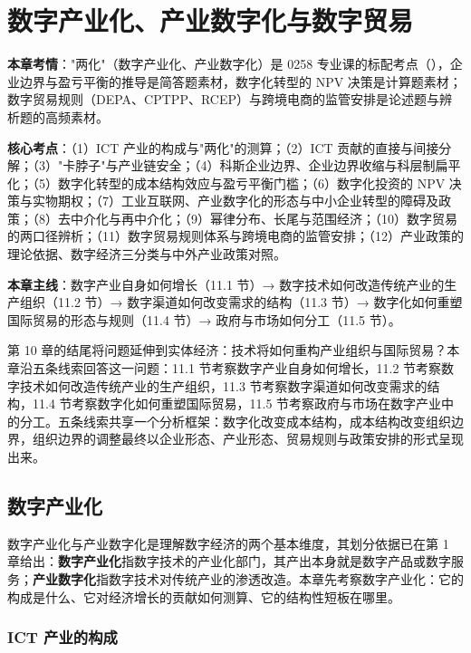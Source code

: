 \chapter{数字产业化、产业数字化与数字贸易}

\begin{examguide}
\textbf{本章考情}："两化"（数字产业化、产业数字化）是 0258 专业课的标配考点（），企业边界与盈亏平衡的推导是简答题素材，数字化转型的 NPV 决策是计算题素材；数字贸易规则（DEPA、CPTPP、RCEP）与跨境电商的监管安排是论述题与辨析题的高频素材。

\textbf{核心考点}：（1）ICT 产业的构成与"两化"的测算；（2）ICT 贡献的直接与间接分解；（3）"卡脖子"与产业链安全；（4）科斯企业边界、企业边界收缩与科层制扁平化；（5）数字化转型的成本结构效应与盈亏平衡门槛；（6）数字化投资的 NPV 决策与实物期权；（7）工业互联网、产业数字化的形态与中小企业转型的障碍及政策；（8）去中介化与再中介化；（9）幂律分布、长尾与范围经济；（10）数字贸易的两口径辨析；（11）数字贸易规则体系与跨境电商的监管安排；（12）产业政策的理论依据、数字经济三分类与中外产业政策对照。

\textbf{本章主线}：数字产业自身如何增长（11.1 节）→ 数字技术如何改造传统产业的生产组织（11.2 节）→ 数字渠道如何改变需求的结构（11.3 节）→ 数字化如何重塑国际贸易的形态与规则（11.4 节）→ 政府与市场如何分工（11.5 节）。
\end{examguide}

第 10 章的结尾将问题延伸到实体经济：技术将如何重构产业组织与国际贸易？本章沿五条线索回答这一问题：11.1 节考察数字产业自身如何增长，11.2 节考察数字技术如何改造传统产业的生产组织，11.3 节考察数字渠道如何改变需求的结构，11.4 节考察数字化如何重塑国际贸易，11.5 节考察政府与市场在数字产业中的分工。五条线索共享一个分析框架：数字化改变成本结构，成本结构改变组织边界，组织边界的调整最终以企业形态、产业形态、贸易规则与政策安排的形式呈现出来。

\section{数字产业化}

数字产业化与产业数字化是理解数字经济的两个基本维度，其划分依据已在第 1 章给出：\textbf{数字产业化}指数字技术的产业化部门，其产出本身就是数字产品或数字服务；\textbf{产业数字化}指数字技术对传统产业的渗透改造。本章先考察数字产业化：它的构成是什么、它对经济增长的贡献如何测算、它的结构性短板在哪里。

\subsection{ICT 产业的构成}

